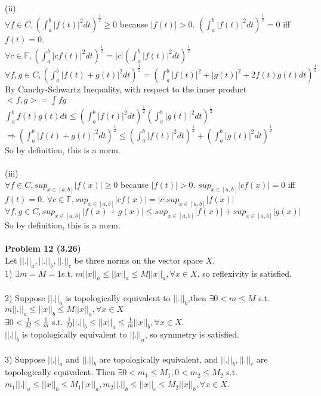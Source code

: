 \documentclass[letterpaper,12pt]{article}
\theoremstyle{definition}
\begin{document}
(ii)\\
$\forall f\in C, (\int_a^b|f(t)|^2dt)^{\frac{1}{2}} \geq 0$ because $|f(t)|>0$. $(\int_a^b|f(t)|^2dt)^{\frac{1}{2}}=0$ iff $f(t)=0$.\\
$\forall c\in \mathbb{F}, (\int_a^b |cf(t)|^2dt)^{\frac{1}{2}} = |c|(\int_a^b |f(t)|^2dt)^{\frac{1}{2}}$\\
$\forall f, g\in C, (\int_a^b|f(t)+g(t)|^2dt)^{\frac{1}{2}}=(\int_a^b|f(t)|^2+|g(t)|^2+2f(t)g(t)dt)^{\frac{1}{2}}$\\
By Cauchy-Schwartz Inequality, with respect to the inner product $<f, g>=\int fg$\\ 
$\int_a^bf(t)g(t)dt\leq (\int_a^b |f(t)|^2dt)^{\frac{1}{2}}(\int_a^b|g(t)|^2dt)^{\frac{1}{2}}$\\
$\Rightarrow (\int_a^b|f(t)+g(t)|^2dt)^{\frac{1}{2}} \leq (\int_a^b|f(t)|^2 dt)^{\frac{1}{2}}+(\int_a^b|g(t)|^2 dt)^{\frac{1}{2}}$\\
So by definition, this is a norm.\\
\\
(iii)\\
$\forall f\in C, sup_{x\in [a,b]}|f(x)| \geq 0$ because $|f(t)|>0$. $sup_{x\in [a,b]}|cf(x)|=0$ iff $f(t)=0$.
$\forall c\in \mathbb{F}, sup_{x\in [a,b]}|cf(x)|=|c|sup_{x\in [a,b]}|f(x)|$\\
$\forall f, g\in C, sup_{x\in [a,b]}|f(x)+g(x)|\leq sup_{x\in [a,b]}|f(x)|+sup_{x\in [a,b]}|g(x)|$\\
So by definition, this is a norm.\\
\\
\noindent\textbf{Problem 12 (3.26)}\\
Let $||.||_a, ||.||_b, ||.||_c$ be three norms on the vector space $X$.\\
1) $\exists m=M=1 $s.t. $m||x||_a\leq ||x||_a\leq M||x||_a, \forall x\in X$, so reflexivity is satisfied. \\
\\
2) Suppose $||.||_a$ is topologically equivalent to  $||.||_b$,then $\exists 0<m\leq M$ s.t. $m||.||_a\leq ||x||_b\leq M||x||_a, \forall x\in X$\\
$\exists 0<\frac{1}{M}\leq \frac{1}{m}$ s.t. $\frac{1}{M}||.||_b\leq ||x||_a\leq \frac{1}{m}||x||_b, \forall x\in X$.\\
$||.||_b$ is topologically equivalent to  $||.||_a$, so symmetry is satisfied.\\
\\
3) Suppose $||.||_a$ and $||.||_b$ are topologically equivalent, and $||.||_b, ||.||_c$ are topologically equivalent. Then $\exists 0<m_1\leq M_1, 0<m_2\leq M_2$ s.t. $m_1||.||_a\leq ||x||_b\leq M_1||x||_a, m_2||.||_b\leq ||x||_c\leq M_2||x||_b, \forall x\in X$.\\
\end{document}
